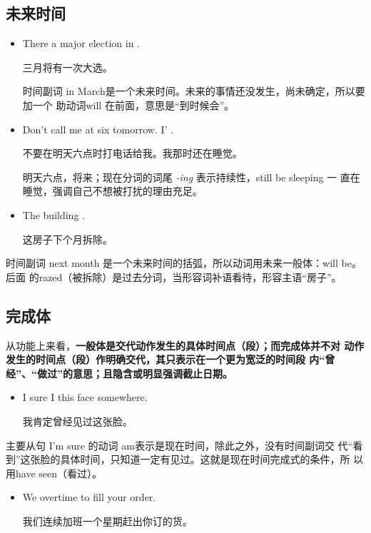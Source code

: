 \subsection{未来时间}

\begin{itemize}
\item  There  a major election in .

  三月将有一次大选。

  时间副词 in March是一个未来时间。未来的事情还没发生，尚未确定，所以要加一个
  助动词will 在前面，意思是“到时候会”。

\item Don't call me at six tomorrow. I'
  .

  不要在明天六点时打电话给我。我那时还在睡觉。

  明天六点，将来；现在分词的词尾 \emph{-ing} 表示持续性，still be sleeping 一
  直在睡觉，强调自己不想被打扰的理由充足。

\item  The building  .

  这房子下个月拆除。
\end{itemize}

时间副词 next month 是一个未来时间的括弧，所以动词用未来一般体：will be。后面
的razed（被拆除）是过去分词，当形容词补语看待，形容主语“房子”。

\subsection{完成体}

从功能上来看，\textbf{一般体是交代动作发生的具体时间点（段）；而完成体并不对
  动作发生的时间点（段）作明确交代，其只表示在一个更为宽泛的时间段
  内“曾经”、“做过”的意思；且隐含或明显强调截止日期。}

\begin{itemize}
\item  I sure I  this face somewhere.

  我肯定曾经见过这张脸。
\end{itemize}
主要从句 I'm sure 的动词 am表示是现在时间，除此之外，没有时间副词交
代“看到”这张脸的具体时间，只知道一定有见过。这就是现在时间完成式的条件，所
以用have seen（看过）。

\begin{itemize}
\item We  overtime  to fill your order.

  我们连续加班一个星期赶出你订的货。
\end{itemize}

